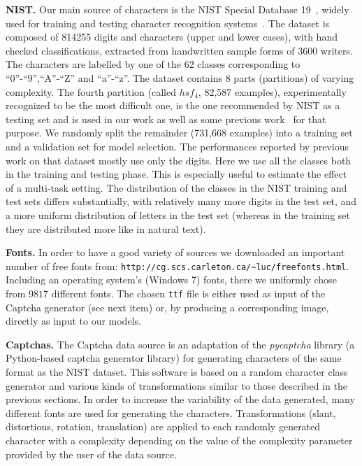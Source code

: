 \documentclass{article} %
\begin{document}
{\bf NIST.}
Our main source of characters is the NIST Special Database 19~\citep{Grother-1995}, 
widely used for training and testing character
recognition systems~\citep{Granger+al-2007,Cortes+al-2000-small,Oliveira+al-2002-short,Milgram+al-2005}. 
The dataset is composed of 814255 digits and characters (upper and lower cases), with hand checked classifications,
extracted from handwritten sample forms of 3600 writers. The characters are labelled by one of the 62 classes 
corresponding to ``0''-``9'',``A''-``Z'' and ``a''-``z''. The dataset contains 8 parts (partitions) of varying complexity. 
The fourth partition (called $hsf_4$, 82,587 examples), 
experimentally recognized to be the most difficult one, is the one recommended 
by NIST as a testing set and is used in our work as well as some previous work~\citep{Granger+al-2007,Cortes+al-2000-small,Oliveira+al-2002-short,Milgram+al-2005}
for that purpose. We randomly split the remainder (731,668 examples) into a training set and a validation set for
model selection. 
The performances reported by previous work on that dataset mostly use only the digits.
Here we use all the classes both in the training and testing phase. This is especially
useful to estimate the effect of a multi-task setting.
The distribution of the classes in the NIST training and test sets differs
substantially, with relatively many more digits in the test set, and a more uniform distribution
of letters in the test set (whereas in the training set they are distributed
more like in natural text).

{\bf Fonts.} 
In order to have a good variety of sources we downloaded an important number of free fonts from:
{\tt http://cg.scs.carleton.ca/\textasciitilde luc/freefonts.html}.
Including an operating system's (Windows 7) fonts, there we uniformly chose from $9817$ different fonts.
The chosen {\tt ttf} file is either used as input of the Captcha generator (see next item) or, by producing a corresponding image, 
directly as input to our models.

{\bf Captchas.}
The Captcha data source is an adaptation of the \emph{pycaptcha} library (a Python-based captcha generator library) for 
generating characters of the same format as the NIST dataset. This software is based on
a random character class generator and various kinds of transformations similar to those described in the previous sections. 
In order to increase the variability of the data generated, many different fonts are used for generating the characters. 
Transformations (slant, distortions, rotation, translation) are applied to each randomly generated character with a complexity
depending on the value of the complexity parameter provided by the user of the data source. 
\end{document}

